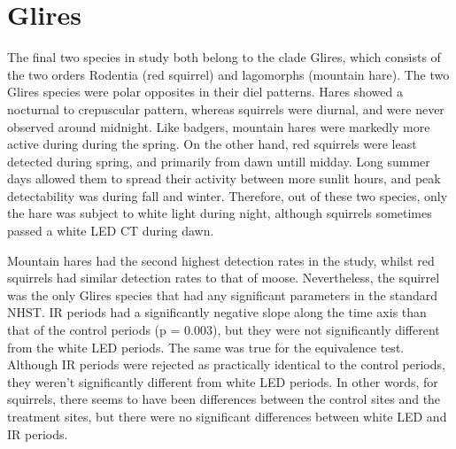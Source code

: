 

\section{Glires}
The final two species in study both belong to the clade Glires, which consists of the two orders Rodentia (red squirrel) and lagomorphs (mountain hare). %
The two Glires species were polar opposites in their diel patterns. Hares showed a nocturnal to crepuscular pattern, whereas squirrels were diurnal, and were never observed around midnight.
Like badgers, mountain hares were markedly more active during during the spring.
On the other hand, red squirrels were least detected during spring, and primarily from dawn untill midday. Long summer days allowed them to spread their activity between more sunlit hours, and peak detectability was during fall and winter.
Therefore, out of these two species, only the hare was subject to white light during night, although squirrels sometimes passed a white LED CT during dawn.

Mountain hares had the second highest detection rates in the study, whilst red squirrels had similar detection rates to that of moose.
Nevertheless, the squirrel was the only Glires species that had any significant parameters in the standard NHST. IR periods had a significantly negative slope along the time axis than that of the control periods (p = 0.003), but they were not significantly different from the white LED periods. %
The same was true for the equivalence test. Although IR periods were rejected as practically identical to the control periods, they weren't significantly different from white LED periods.
In other words, for squirrels, there seems to have been differences between the control sites and the treatment sites, but there were no significant differences between white LED and IR periods.





